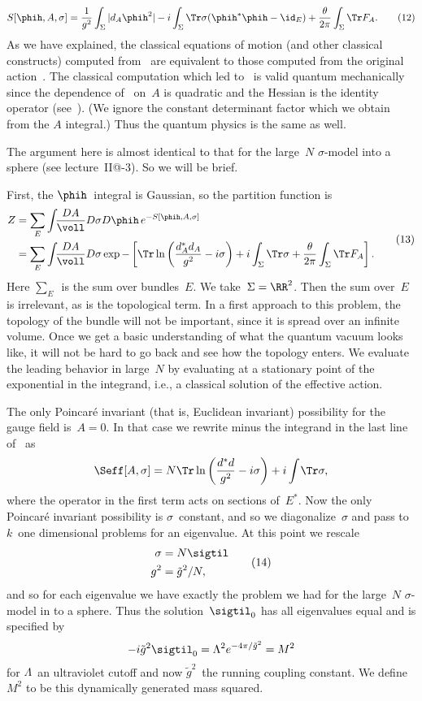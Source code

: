   $$ S[\phih,A,\sigma ] = \frac{1}{g^2}\int_{\Sigma }|d_A\phih^2| -
     i\int_{\Sigma} \Tr\sigma (\phih^*\phih-\id_E) + \frac{\theta }{2\pi
     }\int_{\Sigma }\Tr F_A. \tag{12} $$
As we have explained, the classical equations of motion (and other classical
constructs) computed from~ are equivalent to those computed from
the original action~.  The classical computation which led
to~ is valid quantum mechanically since the dependence
of~ on~$A$ is quadratic and the Hessian is the identity operator
(see~).  (We ignore the constant determinant factor which we
obtain from the $A$ integral.)  Thus the quantum physics is the same as well.


The argument here is almost identical to that for the large~$N$ $\sigma
$-model into a sphere (see lecture~II@-3).  So we will be brief. 
 
First, the $\phih$~integral is Gaussian, so the partition function is 
  $$ \aligned
      Z &= \sum\limits_{E}\int_{}\frac{DA}{\voll}D\sigma
     D\phih\,e^{-S[\phih,A,\sigma ]} \\
      &= \sum\limits_{E}\int_{}\frac{DA}{\voll}D\sigma \exp -\left[ \Tr \ln
     \left( \frac{d_A^*d_A}{g^2}-i\sigma \right) + i\int_{\Sigma }\Tr\sigma +
     \frac{\theta }{2\pi }\int_{\Sigma }\Tr F_A \right]. \endaligned
     \tag{13} $$
Here $\sum\limits_{E}$~is the sum over bundles~$E$.  We take~$\Sigma =\RR^2$.
Then the sum over~$E$ is irrelevant, as is the topological term.  In a first
approach to this problem, the topology of the bundle will not be important,
since it is spread over an infinite volume.  Once we get a basic
understanding of what the quantum vacuum looks like, it will not be hard to
go back and see how the topology enters.  We evaluate the leading behavior in
large~$N$ by evaluating at a stationary point of the exponential in the
integrand, i.e., a classical solution of the effective action.
 
The only Poincar\'e invariant (that is, Euclidean invariant) possibility for
the gauge field is~$A=0$.  In that case we rewrite minus the integrand in the
last line of~ as
  $$ \Seff[A,\sigma ] = N\Tr\ln\left( \frac{d^*d}{g^2} - i\sigma  \right) +
     i\int_{}\;\Tr\sigma ,   $$
where the operator in the first term acts on sections of~$E^*$.  Now the only
Poincar\'e invariant possibility is $\sigma $~constant, and so we
diagonalize~$\sigma $ and pass to $k$~one dimensional problems for an
eigenvalue.  At this point we rescale 
  $$ \aligned
      \sigma &=N\sigtil \\ 
      g^2 &= \tilde{g}^2/N,\endaligned \tag{14} $$
and so for each eigenvalue we have exactly the problem we had for the
large~$N$ $\sigma $-model in to a sphere.  Thus the solution~$\sigtil _0$ has
all eigenvalues equal and is specified by
  $$ -i\tilde{g}^2\sigtil_0 = \Lambda ^2e^{-4\pi /\tilde{g}^2} = M^2 
     $$
for $\Lambda $~an ultraviolet cutoff and now $\tilde{g}^2$~the running
coupling constant.  We define~$M^2$ to be this dynamically generated mass
squared. 
 
